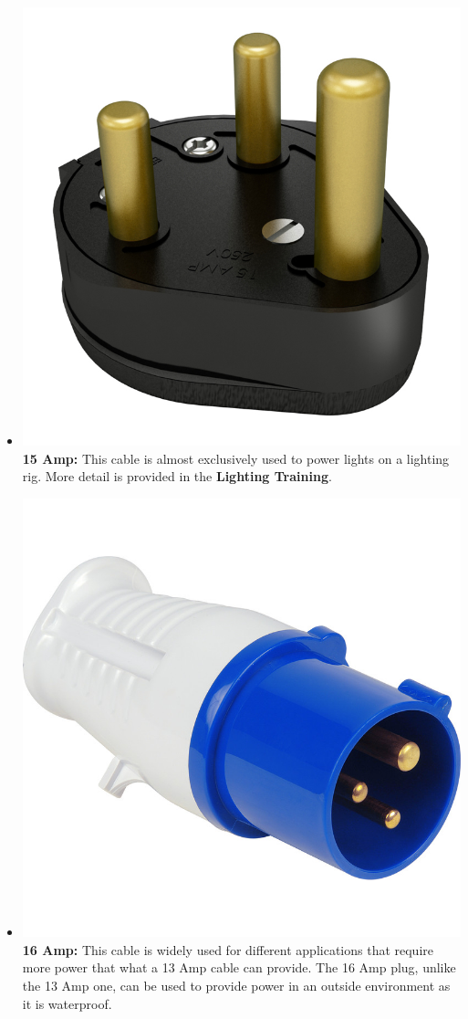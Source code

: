 \documentclass[14pt,twocolumn]{extarticle} %
\begin{document}
\begin{itemize}
\item \includegraphics[scale=0.15]{15amp.jpg}\textbf{15 Amp:} This cable is almost exclusively used to power lights on a lighting rig. More detail is provided in the \textbf{Lighting Training}. 

\item \includegraphics[scale=0.16]{16amp.jpg}\textbf{16 Amp:} This cable is widely used for different applications that require more power that what a 13 Amp cable can provide. The 16 Amp plug, unlike the 13 Amp one, can be used to provide power in an outside environment as it is waterproof. 


\end{itemize}
\end{document}
